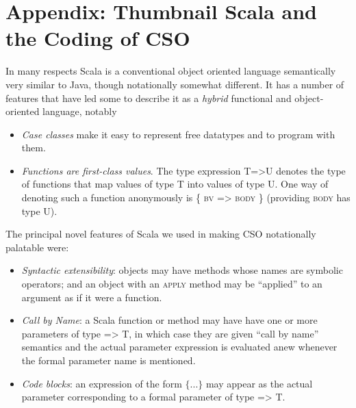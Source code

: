 \documentclass[12pt]{IOS-Book-Article-CPA-2017}
\begin{document}
\newpage\section*{Appendix: Thumbnail Scala and the Coding of CSO}
In many respects Scala is a conventional object oriented language
semantically very similar to Java, though notationally somewhat
different.
%
It has a number of features that have led some to describe it as a
\textit{hybrid} functional and object-oriented language, notably
\begin{itemize}
\item \textit{Case classes} make it
      easy to represent free datatypes and to program with them.

\item \textit{Functions are first-class values}. The type expression \textsc{T=>U} 
      denotes the type of functions that map values of type \textsc{T}
      into values of type \textsc{U}. One way of denoting
      such a function anonymously is \textsc{\{ bv => body \}}
      (providing \textsc{body} has type \textsc{U}).
\end{itemize}
The principal novel features of Scala we used in making
CSO  notationally palatable were:
\begin{itemize}
\item   \textit{Syntactic extensibility}: objects may have methods
        whose names are symbolic operators; and an object
        with an \textsc{apply} method may be ``applied'' to
        an argument as if it were a function.

\item   \textit{Call by Name}: a Scala function or method may have 
        have one or more parameters of type \textsc{=> T}, in which
        case they are given ``call by name'' semantics and the
        actual parameter expression is evaluated anew whenever the
        formal parameter name is mentioned.

\item   \textit{Code blocks}: an expression of the form $\{...\}$
        may appear as the actual parameter corresponding to a formal
        parameter of type \textsc{=> T}. 
\end{itemize}
\end{document}
